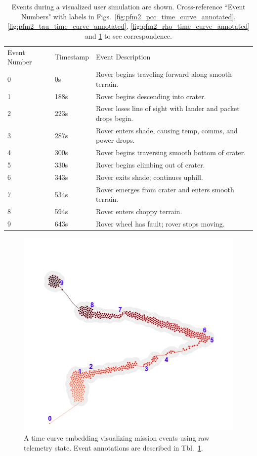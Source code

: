 \begin{table}[]
\centering
\begin{tabular}{lll}
Event Number & Timestamp & Event Description \\
0 & 0s & Rover begins traveling forward along smooth terrain. \\
1 & 188s & Rover begins descending into crater. \\
2 & 223s & Rover loses line of sight with lander and packet drops begin. \\
3 & 287s & Rover enters shade, causing temp, comms, and power drops. \\
4 & 300s & Rover begins traversing smooth bottom of crater. \\
5 & 330s & Rover begins climbing out of crater. \\
6 & 343s & Rover exits shade; continues uphill. \\
7 & 534s & Rover emerges from crater and enters smooth terrain. \\
8 & 594s & Rover enters choppy terrain. \\
9 & 643s & Rover wheel has fault; rover stops moving.
\end{tabular}
\caption{Events during a visualized user simulation are shown. Cross-reference ``Event Numbers" with labels in Figs.~\ref{fig:pfm2_pcc_time_curve_annotated}, \ref{fig:pfm2_tau_time_curve_annotated}, \ref{fig:pfm2_rho_time_curve_annotated} and \ref{fig:pfm2_raw_data_time_curve_annotated} to see correspondence.}
\label{tbl:events}
\end{table}

\begin{figure}[h]
\centering
    \includegraphics{images/pfm2_raw_data_time_curve_annotated.png}
    \caption{A time curve embedding visualizing mission events using raw telemetry state. Event annotations are described in Tbl.~\ref{tbl:events}.}
    \label{fig:pfm2_raw_data_time_curve_annotated}
\end{figure}

